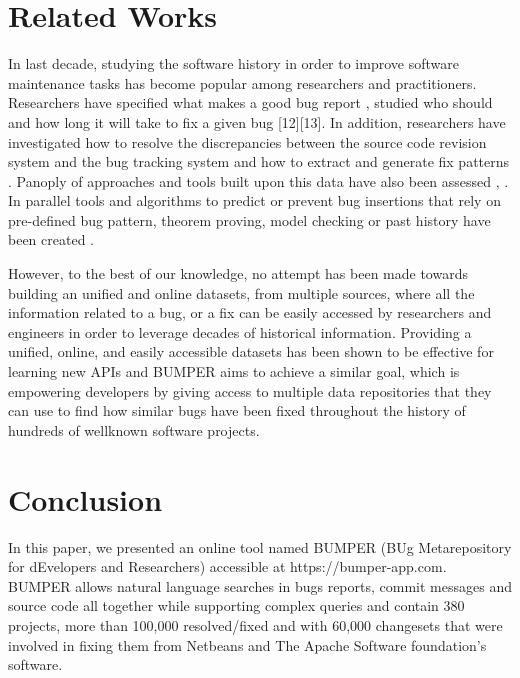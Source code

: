 \documentclass[conference]{IEEEtran}
\begin{document}
\section{Related Works}
\label{sec:Related Works}

In last decade, studying the software history in order to improve software maintenance tasks has become popular among researchers and practitioners.
Researchers have specified what makes a good bug report \cite{Bettenburg2008}, studied who should and how long it will take to fix a given bug [12][13].
In addition, researchers have investigated how to resolve the discrepancies between the source code revision system and the bug tracking system \cite{Wu2011} \cite{Antoniol2002} \cite{Bachmann2010} \cite{Bird2010} and how to extract and generate fix patterns \cite{Kim2013} \cite{Pan2008}.
Panoply of approaches and tools built upon this data have also been assessed \cite{Bird2009}, \cite{Bachmann2009a}.
In parallel tools and algorithms to predict or prevent bug insertions that rely on pre-defined bug pattern, theorem proving, model checking or past history have been created \cite{Dangel2000} \cite{Hovemeyer2007} \cite{Kim2007} \cite{Kim2006a}.

However, to the best of our knowledge, no attempt has been made towards building an unified and online datasets, from multiple sources, where all the information related to a bug, or a fix can be easily accessed by researchers and engineers in order to leverage decades of historical information.
Providing a unified, online, and easily accessible datasets has been shown to be effective for learning new APIs \cite{Montandon2013} \cite{Rahman2013} \cite{Kim2011} and BUMPER aims to achieve a similar goal, which is empowering developers by giving access to multiple data repositories that they can use to find how similar bugs have been fixed throughout the history of hundreds of wellknown software projects.


\section{Conclusion}
\label{sec:conclusion}

In this paper, we presented an online tool named BUMPER (BUg Metarepository for dEvelopers and Researchers) accessible at https://bumper-app.com. BUMPER allows natural language searches in bugs reports, commit messages and source code all together while supporting complex queries and contain 380 projects, more than 100,000 resolved/fixed and with 60,000 changesets that were involved in fixing them from Netbeans and The Apache Software foundation’s software.
\end{document}
